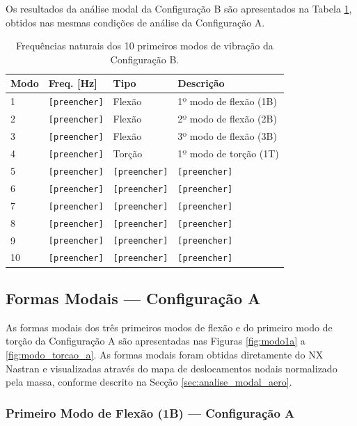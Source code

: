 \documentclass[a4paper,fleqn]{cas-sc}
\begin{document}
Os resultados da análise modal da Configuração B são apresentados na Tabela \ref{tab:freqs_b}, obtidos nas mesmas condições de análise da Configuração A.

\begin{table}
\centering
\caption{Frequências naturais dos 10 primeiros modos de 
vibração da Configuração B.}
\label{tab:freqs_b}
\renewcommand{\arraystretch}{1.4}
\begin{tabularx}{\textwidth}{p{1.5cm} p{3cm} X X}
\toprule
\textbf{Modo} & \textbf{Freq. [\si{\hertz}]} & 
\textbf{Tipo} & \textbf{Descrição} \\
\midrule
1  & \texttt{[preencher]} & Flexão & 1º modo de flexão (1B) \\
2  & \texttt{[preencher]} & Flexão & 2º modo de flexão (2B) \\
3  & \texttt{[preencher]} & Flexão & 3º modo de flexão (3B) \\
4  & \texttt{[preencher]} & Torção & 1º modo de torção (1T) \\
5  & \texttt{[preencher]} & \texttt{[preencher]} & \texttt{[preencher]} \\
6  & \texttt{[preencher]} & \texttt{[preencher]} & \texttt{[preencher]} \\
7  & \texttt{[preencher]} & \texttt{[preencher]} & \texttt{[preencher]} \\
8  & \texttt{[preencher]} & \texttt{[preencher]} & \texttt{[preencher]} \\
9  & \texttt{[preencher]} & \texttt{[preencher]} & \texttt{[preencher]} \\
10 & \texttt{[preencher]} & \texttt{[preencher]} & \texttt{[preencher]} \\
\bottomrule
\end{tabularx}
\end{table}

\subsection{Formas Modais --- Configuração A}

As formas modais dos três primeiros modos de flexão e do primeiro modo de torção da Configuração A são apresentadas nas Figuras \ref{fig:modo1a} a \ref{fig:modo_torcao_a}. As formas modais foram obtidas diretamente do NX Nastran e visualizadas através do mapa de deslocamentos nodais normalizado pela massa, conforme descrito na Secção \ref{sec:analise_modal_aero}.

\subsubsection{Primeiro Modo de Flexão (1B) --- Configuração A}
\end{document}
